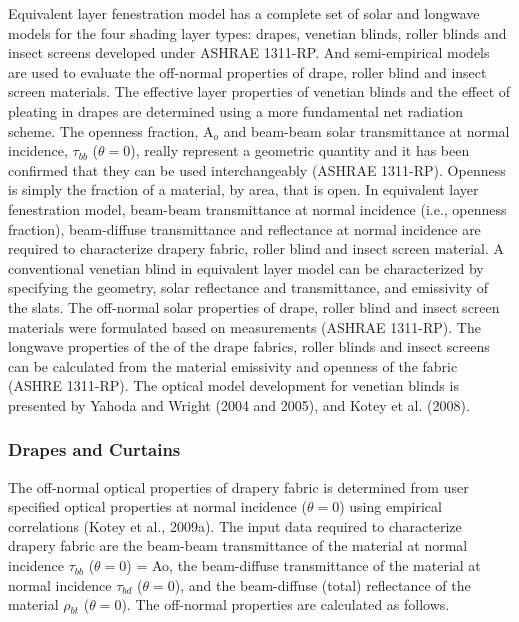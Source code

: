 Equivalent layer fenestration model has a complete set of solar and longwave models for the four shading layer types: drapes, venetian blinds, roller blinds and insect screens developed under ASHRAE 1311-RP. And semi-empirical models are used to evaluate the off-normal properties of drape, roller blind and insect screen materials. The effective layer properties of venetian blinds and the effect of pleating in drapes are determined using a more fundamental net radiation scheme. The openness fraction, A\(_{o}\) and beam-beam solar transmittance at normal incidence, {$\tau$}\(_{bb}\) ($\theta = 0$), really represent a geometric quantity and it has been confirmed that they can be used interchangeably (ASHRAE 1311-RP). Openness is simply the fraction of a material, by area, that is open. In equivalent layer fenestration model, beam-beam transmittance at normal incidence (i.e., openness fraction), beam-diffuse transmittance and reflectance at normal incidence are required to characterize drapery fabric, roller blind and insect screen material. A conventional venetian blind in equivalent layer model can be characterized by specifying the geometry, solar reflectance and transmittance, and emissivity of the slats. The off-normal solar properties of drape, roller blind and insect screen materials were formulated based on measurements (ASHRAE 1311-RP). The longwave properties of the of the drape fabrics, roller blinds and insect screens can be calculated from the material emissivity and openness of the fabric (ASHRE 1311-RP). The optical model development for venetian blinds is presented by Yahoda and Wright (2004 and 2005), and Kotey et al. (2008).

\subsubsection{Drapes and Curtains}\label{drapes-and-curtains}

The off-normal optical properties of drapery fabric is determined from user specified optical properties at normal incidence ($\theta = 0$) using empirical correlations (Kotey et al., 2009a). The input data required to characterize drapery fabric are the beam-beam transmittance of the material at normal incidence {$\tau$}\(_{bb}\) ($\theta = 0$) = Ao, the beam-diffuse transmittance of the material at normal incidence {$\tau$}\(_{bd}\) ($\theta = 0$), and the beam-diffuse (total) reflectance of the material {$\rho$}\(_{bt}\) ($\theta = 0$). The off-normal properties are calculated as follows.

